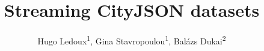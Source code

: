 \documentclass{isprs} %
\begin{document}
\title{Streaming CityJSON datasets}

\author{
 Hugo Ledoux\textsuperscript{1}, Gina Stavropoulou\textsuperscript{1}, Balázs Dukai\textsuperscript{2}}

\address{
	\textsuperscript{1 }Delft University of Technology, the Netherlands---\texttt{[h.ledoux, g.stavropoulou]@tudelft.nl}\\
	\textsuperscript{2 }3DGI, the Netherlands---\texttt{balazs.dukai@3dgi.nl}\\
}


\end{document}

